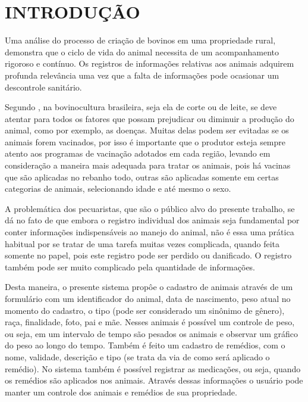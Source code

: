 %
%


\chapter{\textbf{INTRODUÇÃO}}\label{chap:introducao}

Uma análise do processo de criação de bovinos em uma propriedade rural, demonstra que o ciclo de vida do animal necessita de um acompanhamento rigoroso e contínuo. Os registros de informações relativas aos animais adquirem profunda relevância uma vez que a falta de informações pode ocasionar um descontrole sanitário.

Segundo , na bovinocultura brasileira, seja ela de corte ou de leite, se deve atentar para todos os fatores que possam prejudicar ou diminuir a produção do animal, como por exemplo, as doenças. Muitas  delas podem ser evitadas se os animais forem vacinados, por isso é importante que o produtor esteja sempre atento aos programas de vacinação adotados em cada região, levando em consideração a maneira mais adequada para tratar os animais, pois há vacinas que são aplicadas no rebanho todo, outras são aplicadas somente em certas categorias de animais, selecionando idade e até mesmo o sexo.

A problemática dos pecuaristas, que são o público alvo do presente trabalho, se dá no fato de que embora o registro individual dos animais seja fundamental por conter informações indispensáveis ao manejo do animal, não é essa uma prática habitual por se tratar de uma tarefa muitas vezes complicada, quando feita somente no papel, pois este registro pode ser perdido ou danificado. O registro também pode ser muito complicado pela quantidade de informações.

Desta maneira, o presente sistema propôe o cadastro de animais através de um formulário com um identificador do animal, data de nascimento, peso atual no momento do cadastro, o tipo (pode ser considerado um sinônimo de gênero), raça, finalidade, foto, pai e mãe. Nesses animais é possível um controle de peso, ou seja, em um intervalo de tempo são pesados os animais e observar um gráfico do peso ao longo do tempo. Também é feito um cadastro de remédios, com o nome, validade, descrição e tipo (se trata da via de como será aplicado o remédio). No sistema também é possível registrar as medicações, ou seja, quando os remédios são aplicados nos animais. Através dessas informações o usuário pode manter um controle dos animais e remédios de sua propriedade.
